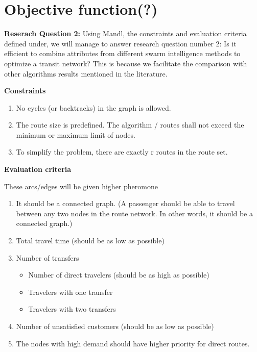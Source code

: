 \section{Objective function(?)}
\textbf{Reserach Question 2: }
Using Mandl, the constraints and evaluation criteria defined under, we will manage to answer research question number 2: Is it efficient to combine attributes from different swarm intelligence methods to optimize a transit network? This is because we facilitate the comparison with other algorithms results mentioned in the literature. 

\textbf{Constraints}
\begin{enumerate}
\item \label{itm:constraintCycles} No cycles (or backtracks) in the graph is allowed.
\item \label{itm:constraintRouteSize} The route size is predefined. The algorithm / routes shall not exceed the minimum or maximum limit of nodes.
\item \label{itm:constraintRouteSet} To simplify the problem, there are exactly r routes in the route set.
\end{enumerate}

\textbf{Evaluation criteria}
\par
These arcs/edges will be given higher pheromone
\begin{enumerate}
\item \label{itm:criteriaConnectedGraph} It should be a connected graph. (A passenger should be able to travel between any two nodes in the route network. In other words, it should be a connected graph.) 
\item \label{itm:criteriaTotalTravelTime} Total travel time (should be as low as possible)
\item \label{itm:f2} Number of transfers
\begin{itemize}
\item Number of direct travelers (should be as high as possible)
\item Travelers with one transfer
\item Travelers with two transfers
\end{itemize}
\item \label{itm:TODO} Number of unsatisfied customers (should be as low as possible)
\item \label{itm:TODO} The nodes with high demand should have higher priority for direct routes.
\end{enumerate}


